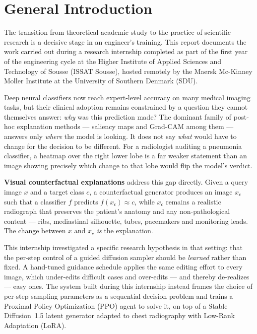 \chapter*{General Introduction}

The transition from theoretical academic study to the practice of
scientific research is a decisive stage in an engineer's training. This
report documents the work carried out during a research internship
completed as part of the first year of the engineering cycle at the
Higher Institute of Applied Sciences and Technology of Sousse (ISSAT
Sousse), hosted remotely by the Maersk Mc-Kinney Moller Institute at the
University of Southern Denmark (SDU).

Deep neural classifiers now reach expert-level accuracy on many medical
imaging tasks, but their clinical adoption remains constrained by a
question they cannot themselves answer: \emph{why} was this prediction
made? The dominant family of post-hoc explanation methods --- saliency
maps and Grad-CAM among them --- answers only \emph{where} the model is
looking. It does not say \emph{what} would have to change for the
decision to be different. For a radiologist auditing a pneumonia
classifier, a heatmap over the right lower lobe is a far weaker statement
than an image showing precisely which change to that lobe would flip the
model's verdict.

\textbf{Visual counterfactual explanations} address this gap directly.
Given a query image $x$ and a target class $c$, a counterfactual
generator produces an image $x_c$ such that a classifier $f$ predicts
$f(x_c) \approx c$, while $x_c$ remains a realistic radiograph that
preserves the patient's anatomy and any non-pathological content --- ribs,
mediastinal silhouette, tubes, pacemakers and monitoring leads. The
change between $x$ and $x_c$ \emph{is} the explanation.

This internship investigated a specific research hypothesis in that
setting: that the per-step control of a guided diffusion sampler should
be \emph{learned} rather than fixed. A hand-tuned guidance schedule
applies the same editing effort to every image, which under-edits
difficult cases and over-edits --- and thereby de-realizes --- easy ones.
The system built during this internship instead frames the choice of
per-step sampling parameters as a sequential decision problem and trains
a Proximal Policy Optimization (PPO) agent to solve it, on top of a
Stable Diffusion~1.5 latent generator adapted to chest radiography with
Low-Rank Adaptation (LoRA).

